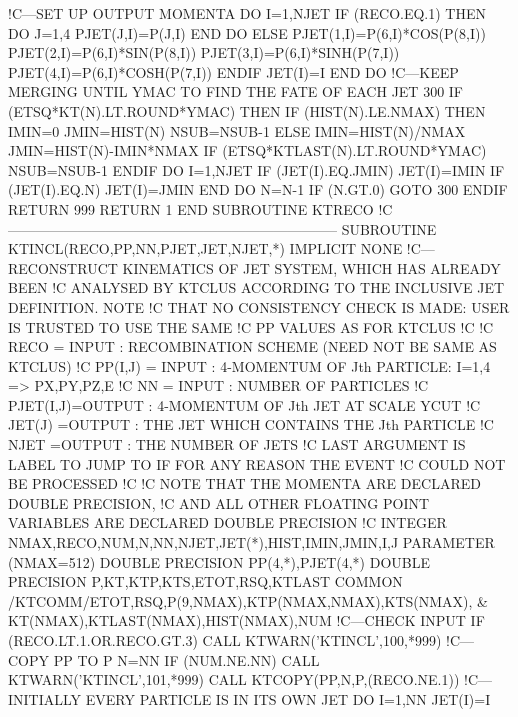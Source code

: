!C---SET UP OUTPUT MOMENTA
      DO I=1,NJET
         IF (RECO.EQ.1) THEN
            DO J=1,4
               PJET(J,I)=P(J,I)
            END DO
         ELSE
            PJET(1,I)=P(6,I)*COS(P(8,I))
            PJET(2,I)=P(6,I)*SIN(P(8,I))
            PJET(3,I)=P(6,I)*SINH(P(7,I))
            PJET(4,I)=P(6,I)*COSH(P(7,I))
         ENDIF
         JET(I)=I
      END DO
!C---KEEP MERGING UNTIL YMAC TO FIND THE FATE OF EACH JET
300   IF (ETSQ*KT(N).LT.ROUND*YMAC) THEN
         IF (HIST(N).LE.NMAX) THEN
            IMIN=0
            JMIN=HIST(N)
            NSUB=NSUB-1
         ELSE
            IMIN=HIST(N)/NMAX
            JMIN=HIST(N)-IMIN*NMAX
            IF (ETSQ*KTLAST(N).LT.ROUND*YMAC) NSUB=NSUB-1
         ENDIF
         DO I=1,NJET
            IF (JET(I).EQ.JMIN) JET(I)=IMIN
            IF (JET(I).EQ.N) JET(I)=JMIN
         END DO
         N=N-1
         IF (N.GT.0) GOTO 300
      ENDIF
      RETURN
999   RETURN 1
    END SUBROUTINE KTRECO
!C-----------------------------------------------------------------------
\nwendcode{}\plusendmoddef
    SUBROUTINE KTINCL(RECO,PP,NN,PJET,JET,NJET,*)
      IMPLICIT NONE
!C---RECONSTRUCT KINEMATICS OF JET SYSTEM, WHICH HAS ALREADY BEEN
!C   ANALYSED BY KTCLUS ACCORDING TO THE INCLUSIVE JET DEFINITION. NOTE
!C   THAT NO CONSISTENCY CHECK IS MADE: USER IS TRUSTED TO USE THE SAME
!C   PP VALUES AS FOR KTCLUS
!C
!C   RECO     = INPUT : RECOMBINATION SCHEME (NEED NOT BE SAME AS KTCLUS)
!C   PP(I,J)  = INPUT : 4-MOMENTUM OF Jth PARTICLE: I=1,4 => PX,PY,PZ,E
!C   NN       = INPUT : NUMBER OF PARTICLES
!C   PJET(I,J)=OUTPUT : 4-MOMENTUM OF Jth JET AT SCALE YCUT
!C   JET(J)   =OUTPUT : THE JET WHICH CONTAINS THE Jth PARTICLE
!C   NJET     =OUTPUT : THE NUMBER OF JETS
!C   LAST ARGUMENT IS LABEL TO JUMP TO IF FOR ANY REASON THE EVENT
!C   COULD NOT BE PROCESSED
!C
!C   NOTE THAT THE MOMENTA ARE DECLARED DOUBLE PRECISION,
!C   AND ALL OTHER FLOATING POINT VARIABLES ARE DECLARED DOUBLE PRECISION
!C
      INTEGER NMAX,RECO,NUM,N,NN,NJET,JET(*),HIST,IMIN,JMIN,I,J
      PARAMETER (NMAX=512)
      DOUBLE PRECISION PP(4,*),PJET(4,*)
      DOUBLE PRECISION P,KT,KTP,KTS,ETOT,RSQ,KTLAST
      COMMON /KTCOMM/ETOT,RSQ,P(9,NMAX),KTP(NMAX,NMAX),KTS(NMAX), &
           KT(NMAX),KTLAST(NMAX),HIST(NMAX),NUM
!C---CHECK INPUT
      IF (RECO.LT.1.OR.RECO.GT.3) CALL KTWARN('KTINCL',100,*999)
!C---COPY PP TO P
      N=NN
      IF (NUM.NE.NN) CALL KTWARN('KTINCL',101,*999)
      CALL KTCOPY(PP,N,P,(RECO.NE.1))
!C---INITIALLY EVERY PARTICLE IS IN ITS OWN JET
      DO I=1,NN
         JET(I)=I

